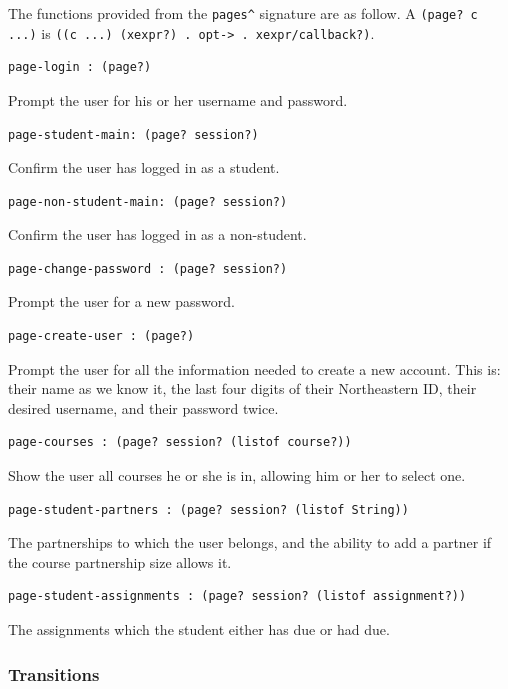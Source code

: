 \documentclass[a4paper]{article}
\begin{document}
The functions provided from the \verb|pages^| signature are as follow. A
\verb|(page? c ...)| is \verb|((c ...) (xexpr?) . opt-> . xexpr/callback?)|.

\begin{verbatim}
page-login : (page?)
\end{verbatim}
Prompt the user for his or her username and password.

\begin{verbatim}
page-student-main: (page? session?)
\end{verbatim}
Confirm the user has logged in as a student.

\begin{verbatim}
page-non-student-main: (page? session?)
\end{verbatim}
Confirm the user has logged in as a non-student.

\begin{verbatim}
page-change-password : (page? session?)
\end{verbatim}
Prompt the user for a new password.

\begin{verbatim}
page-create-user : (page?)
\end{verbatim}
Prompt the user for all the information needed to create a
new account. This is: their name as we know it, the last
four digits of their Northeastern ID, their desired username,
and their password twice.

\begin{verbatim}
page-courses : (page? session? (listof course?))
\end{verbatim}
Show the user all courses he or she is in, allowing him or her to select one.

\begin{verbatim}
page-student-partners : (page? session? (listof String))
\end{verbatim}
The partnerships to which the user belongs, and the ability to add a partner if
the course partnership size allows it.

\begin{verbatim}
page-student-assignments : (page? session? (listof assignment?))
\end{verbatim}
The assignments which the student either has due or had due.

\subsubsection{Transitions}\label{subsubsec:transitions}
\end{document}

